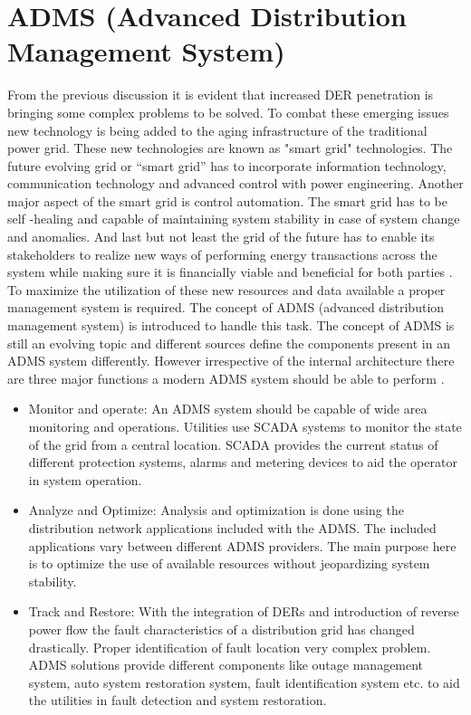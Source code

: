 \section{ADMS (Advanced Distribution Management System)}
From the previous discussion it is evident that increased DER penetration is bringing some complex problems to be solved. To combat these emerging issues new technology is being added to the aging infrastructure of the traditional power grid. These new technologies are known as "smart grid" technologies. The future evolving grid or “smart grid” has to incorporate information technology, communication technology and advanced control with power engineering. Another major aspect of the smart grid is control automation. The smart grid has to be self -healing and capable of maintaining system stability in case of system change and anomalies. And last but not least the grid of the future has to enable its stakeholders to realize new ways of performing energy transactions across the system while making sure it is financially viable and beneficial for both parties \cite{SG1}. To maximize the utilization of these new resources and data available a proper management system is required. The concept of ADMS (advanced distribution management system) is introduced to handle this task. The concept of ADMS is still an evolving topic and different sources define the components present in an ADMS system differently. However irrespective of the internal architecture there are three major functions a modern ADMS system should be able to perform \cite{ADMS_1}.
\begin{itemize}
    \item Monitor and operate: An ADMS system should be capable of wide area monitoring and operations. Utilities use SCADA systems to monitor the state of the grid from a central location. SCADA provides the current status of different protection systems, alarms and metering devices to aid the operator in system operation.
    \item Analyze and Optimize: Analysis and optimization is done using the distribution network applications included with the ADMS. The included applications vary between different ADMS providers. The main purpose here is to optimize the use of available resources without jeopardizing system stability.
    \item Track and Restore: With the integration of DERs and introduction of reverse power flow the fault characteristics of a distribution grid has changed drastically. Proper identification of fault location very complex problem. ADMS solutions provide different components like outage management system, auto system restoration system, fault identification system etc. to aid the utilities in fault detection and system restoration.
\end{itemize}
